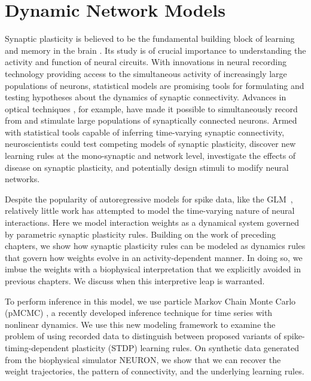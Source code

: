 
\chapter{Dynamic Network Models}
\label{chap:six}

Synaptic plasticity is believed to be the fundamental building block
of learning and memory in the brain \citep{DayanAbbott}. Its study is of crucial
importance to understanding the activity and function of neural
circuits. With innovations in neural recording technology providing
access to the simultaneous activity of increasingly large populations
of neurons, statistical models are promising tools for formulating and
testing hypotheses about the dynamics of synaptic
connectivity. Advances in optical techniques \citep{Packer-2012,
  Hochbaum-2014}, for example, have made it possible to simultaneously
record from and stimulate large populations of synaptically connected
neurons. Armed with statistical tools capable of inferring
time-varying synaptic connectivity, neuroscientists could test
competing models of synaptic plasticity, discover new learning rules
at the mono-synaptic and network level, investigate the effects of
disease on synaptic plasticity, and potentially design stimuli to
modify neural networks.

Despite the popularity of autoregressive models for spike data, like 
the GLM~\citep{Paninski-2004, Truccolo-2005, Pillow-2008},
relatively little work has attempted to model the time-varying nature
of neural interactions.  Here we model interaction weights as a
dynamical system governed by parametric synaptic plasticity rules. 
Building on the work of preceding chapters, 
we show how synaptic plasticity rules can be modeled as dynamics 
rules that govern how weights evolve in an activity-dependent manner.
In doing so, we imbue the weights with a biophysical interpretation 
that we explicitly avoided in previous chapters. We discuss when this
interpretive leap is warranted. 

To perform inference in this model, we use particle Markov Chain Monte
Carlo (pMCMC) \citep{Andrieu-2010}, a recently developed inference
technique for time series with nonlinear dynamics.  We use this new
modeling framework to examine the problem of using recorded data to
distinguish between proposed variants of spike-timing-dependent
plasticity (STDP) learning rules. On synthetic data generated from the
biophysical  simulator NEURON, we show that we can recover the weight
trajectories, the pattern of connectivity, and the underlying learning
rules.

